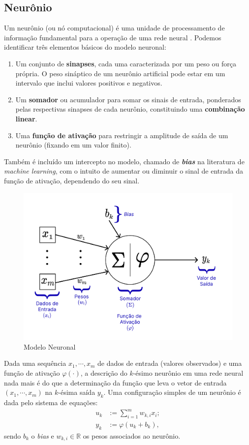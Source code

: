 \documentclass[twoside]{automatextcc}
\newcommand{\R}{\mathds{R}}
\begin{document}
\subsection{Neurônio}
Um neurônio (ou nó computacional) é uma unidade de processamento de informação fundamental para a operação de uma rede neural \citep{haykin2009}. Podemos identificar três elementos básicos do modelo neuronal:
\begin{enumerate}
    \item Um conjunto de \textbf{sinapses}, cada uma caracterizada por um peso ou força própria. O peso sináptico de um neurônio artificial pode estar em um intervalo que inclui valores positivos e negativos.
    \item Um \textbf{somador} ou acumulador para somar os sinais de entrada, ponderados pelas respectivas sinapses de cada neurônio, constituindo uma \textbf{combinação linear}.
    \item Uma \textbf{função de ativação} para restringir a amplitude de saída de um neurônio (fixando em um valor finito).
\end{enumerate}
Também é incluído um intercepto no modelo, chamado de \textbf{\textit{bias}} na literatura de \textit{machine learning}, com o intuito de aumentar ou diminuir o sinal de entrada da função de ativação, dependendo do seu sinal.

\FloatBarrier
\begin{figure}[h!]
    \centering
    \includegraphics[width=.7\textwidth]{figuras/neuron_model.pdf}
	\caption{Modelo Neuronal \citep[adaptado de][]{hair2005,haykin2009}}
\end{figure}

Dada uma sequência $x_1,\cdots,x_m$ de dados de entrada (valores observados) e uma função de ativação $\varphi(\cdot)$, a descrição do $k$-ésimo neurônio em uma rede neural nada mais é do que a determinação da função que leva o vetor de entrada $(x_1,\cdots,x_m)$ na $k$-ésima saída $y_k$. Uma configuração simples de um neurônio é dada pelo sistema de equações:
\begin{align}\label{vk}
    u_k & := \sum_{i=1}^{m} w_{k,i}x_i; \nonumber\\   
    y_k & := \varphi(u_k + b_k),
\end{align}
sendo $b_k$ o \textit{bias} e $w_{k,i} \in \R$ os pesos associados ao neurônio.
\end{document}
